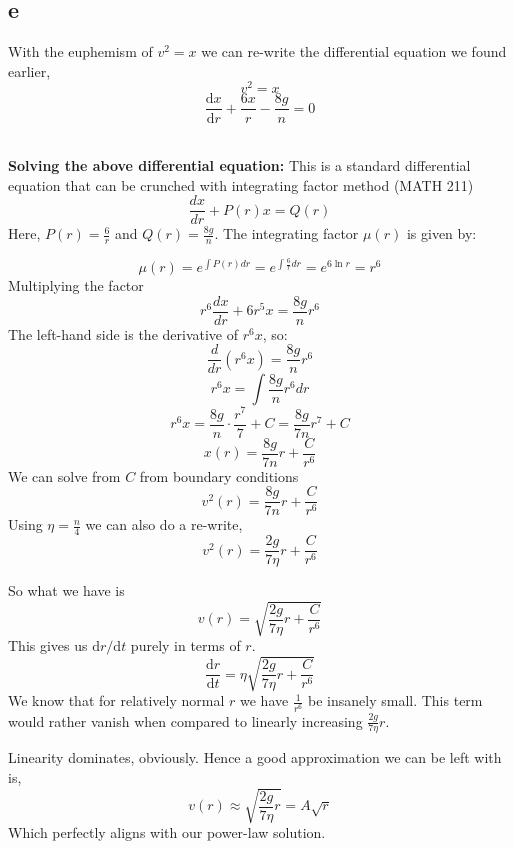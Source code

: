 \documentclass[letter]{article}
\begin{document}
\subsection{e} 
With the euphemism of $v^2 = x$ we can re-write the differential equation we found earlier, 
\[
v^2 = x
\] 
\[
\boxed{
\frac{\mathrm{d} x}{\mathrm{d} r} + \frac{6x}{r} - \frac{8g}{n} = 0
}
\] 
\
\begin{tcolorbox}[colback=white,colframe=gray,sharp corners]
	\textbf{Solving the above differential equation: }
This is a standard differential equation that can be crunched with integrating factor method (MATH 211)
\[
\frac{dx}{dr} + P(r)x = Q(r)
\]
Here, \( P(r) = \frac{6}{r} \) and \( Q(r) = \frac{8g}{n} \).
The integrating factor \( \mu(r) \) is given by:

\[
\mu(r) = e^{\int P(r) dr} = e^{\int \frac{6}{r} dr} = e^{6 \ln r} = r^6
\]
Multiplying the factor
\[
r^6 \frac{dx}{dr} + 6r^5x = \frac{8g}{n} r^6
\]
The left-hand side is the derivative of \( r^6x \), so:
\[
\frac{d}{dr}(r^6x) = \frac{8g}{n}r^6
\]
\[
r^6x = \int \frac{8g}{n}r^6 dr
\]
\[
r^6x = \frac{8g}{n} \cdot \frac{r^7}{7} + C = \frac{8g}{7n}r^7 + C
\]
\[
x(r) = \frac{8g}{7n}r + \frac{C}{r^6}
\]
We can solve from $C$ from boundary conditions 
\[
\boxed{
v^2 (r) = \frac{8g}{7n} r + \frac{C}{r^{6}}
}
\]
Using $ \eta = \frac{n}{4}$ we can also do a re-write, 
\[
\boxed{
v^2(r) = \frac{2g}{7 \eta }r + \frac{C}{r^{6}}
}
\] 
\end{tcolorbox}
So what we have is 
\[
v(r) = \sqrt{\frac{2g}{7 \eta} r + \frac{C}{r^{6}}} 
\]
This gives us $\mathrm{d} r / \mathrm{d} t$ purely in terms of $r$. 
\[
\frac{\mathrm{d} r}{\mathrm{d} t} = \eta 
 \sqrt{\frac{2g}{7 \eta} r + \frac{C}{r^{6}}} 
\] 
We know that for relatively normal $r$ we have $\frac{1}{r^{6}} $ be insanely small. This term would rather vanish when compared to linearly increasing $\frac{2g}{7 \eta} r$.

\begin{center}
\end{center}
Linearity dominates, obviously. Hence a good approximation we can be left with is, 
\[
v(r) \approx \sqrt{\frac{2g}{7 \eta } r}  = A \sqrt{r} 
\] 
Which perfectly aligns with our power-law solution. 
\newpage
\end{document}
